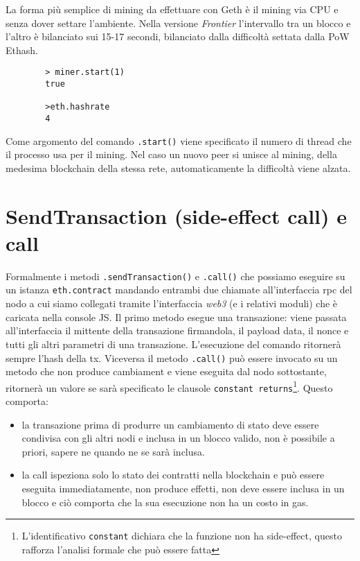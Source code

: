 \begin{appendices}
		La forma più semplice di mining da effettuare con Geth è il mining via CPU e senza dover settare l'ambiente. Nella versione \textit{Frontier} l'intervallo tra un blocco e l'altro è bilanciato sui 15-17 secondi, bilanciato dalla difficoltà settata dalla PoW Ethash.
		
		\begin{lstlisting}	
		> miner.start(1)
		true
		
		>eth.hashrate
		4
		\end{lstlisting}
		
		Come argomento del comando \lstinline|.start()| viene specificato il numero di thread che il processo usa per il mining. Nel caso un nuovo peer si unisce al mining, della medesima blockchain della stessa rete, automaticamente la difficoltà viene alzata.
		
		\iffalse
		\begin{lstlisting}
		eth.getBlock("pending", true).transactions
		\end{lstlisting}
		\fi
	\section{SendTransaction (side-effect call) e call}\label{appendice:c}
	
	Formalmente i metodi \lstinline|.sendTransaction()| e \lstinline|.call()| che possiamo eseguire su un istanza \lstinline|eth.contract| mandando entrambi due chiamate all'interfaccia rpc del nodo a cui siamo collegati tramite l'interfaccia \textit{web3} (e i relativi moduli) che è caricata nella console JS. Il primo metodo esegue una transazione: viene passata all'interfaccia il mittente della transazione firmandola, il payload data, il nonce e tutti gli altri parametri di una transazione. L'esecuzione del comando ritornerà sempre l'hash della tx. Viceversa il metodo \lstinline|.call()| può essere invocato su un metodo che non produce cambiament e viene eseguita dal nodo sottostante, ritornerà un valore se sarà specificato le clausole \lstinline|constant returns|\footnote{L'identificativo \lstinline|constant| dichiara che la funzione non ha side-effect, questo rafforza l'analisi formale che può essere fatta}. 
	Questo comporta:
	\begin{itemize}
		\item la transazione prima di produrre un cambiamento di stato deve essere condivisa con gli altri nodi e inclusa in un blocco valido, non è possibile a priori, sapere ne quando ne se sarà inclusa. 
		\item la call ispeziona solo lo stato dei contratti nella blockchain e può essere eseguita immediatamente, non produce effetti, non deve essere inclusa in un blocco e ciò comporta che la sua esecuzione non ha un costo in gas.
	\end{itemize}
	

\end{appendices}

